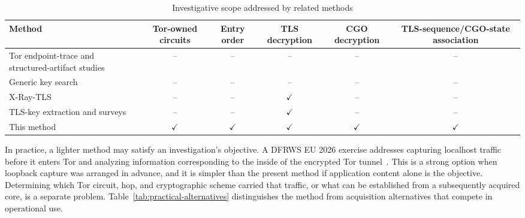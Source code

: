 \documentclass[10pt,a4paper]{article}
\begin{document}
\begin{table}[!tbp]
\centering
\caption{Investigative scope addressed by related methods}
\label{tab:related-matrix}
\small
\begin{tabularx}{\linewidth}{Yccccc}
\toprule
Method & Tor-owned circuits & Entry order & TLS decryption & CGO decryption & TLS-sequence/CGO-state association \\
\midrule
Tor endpoint-trace and structured-artifact studies~\cite{alfosail2021tor,muir2019forensic,pizzolante2021torbrowser} & -- & -- & -- & -- & -- \\
Generic key search~\cite{maartmannmoe2009persistence} & -- & -- & -- & -- & -- \\
X-Ray-TLS~\cite{moriconi2024xraytls} & -- & -- & $\checkmark$ & -- & -- \\
TLS-key extraction and surveys~\cite{baier2024tlsmemory,baier2025allyourtlskeys} & -- & -- & $\checkmark$ & -- & -- \\
This method & $\checkmark$ & $\checkmark$ & $\checkmark$ & $\checkmark$ & $\checkmark$ \\
\bottomrule
\end{tabularx}
\end{table}

In practice, a lighter method may satisfy an investigation's objective. A DFRWS EU 2026 exercise addresses capturing localhost traffic before it enters Tor and analyzing information corresponding to the inside of the encrypted Tor tunnel~\cite{dfrws2026localtor}. This is a strong option when loopback capture was arranged in advance, and it is simpler than the present method if application content alone is the objective. Determining which Tor circuit, hop, and cryptographic scheme carried that traffic, or what can be established from a subsequently acquired core, is a separate problem. Table~\ref{tab:practical-alternatives} distinguishes the method from acquisition alternatives that compete in operational use.
\end{document}
